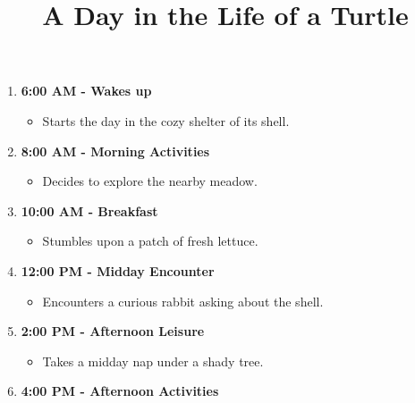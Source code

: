 \documentclass{article}
\title{A Day in the Life of a Turtle}
\date{}
\begin{document}
\maketitle

\begin{enumerate}
\item \textbf{6:00 AM - Wakes up}
\begin{itemize}
\item Starts the day in the cozy shelter of its shell.
\end{itemize}
\item \textbf{8:00 AM - Morning Activities}
\begin{itemize}
\item Decides to explore the nearby meadow.
\end{itemize}
\item \textbf{10:00 AM - Breakfast}
\begin{itemize}
\item Stumbles upon a patch of fresh lettuce.
\end{itemize}
\item \textbf{12:00 PM - Midday Encounter}
\begin{itemize}
\item Encounters a curious rabbit asking about the shell.
\end{itemize}
\item \textbf{2:00 PM - Afternoon Leisure}
\begin{itemize}
\item Takes a midday nap under a shady tree.
\end{itemize}
\item \textbf{4:00 PM - Afternoon Activities}
\begin{itemize}

\end{itemize}
\end{enumerate}
\end{document}
